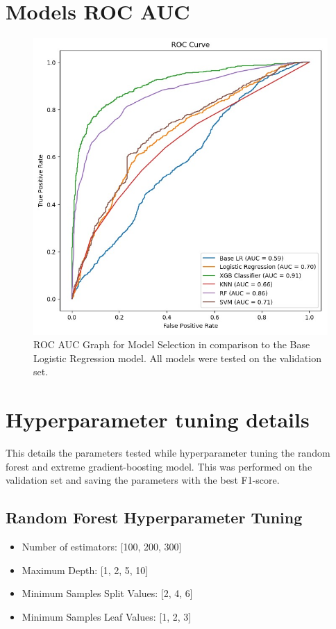 \documentclass{article}
\begin{document}
\begin{appendices}
\section{Models ROC AUC}
\begin{figure}[H]
  \centering
  \includegraphics[width=0.8\linewidth]{rocCurve.jpg}
  \caption{ROC AUC Graph for Model Selection in comparison to the Base Logistic Regression model. All models were tested on the validation set.}
  \label{fig:dist}
\end{figure}


\section{Hyperparameter tuning details}
This details the parameters tested while hyperparameter tuning the random forest and extreme gradient-boosting model. This was performed on the validation set and saving the parameters with the best F1-score.
\subsection{Random Forest Hyperparameter Tuning}
\begin{itemize}
    \item Number of estimators: [100, 200, 300]
    \item Maximum Depth: [1, 2, 5, 10]
    \item Minimum Samples Split Values: [2, 4, 6]
    \item Minimum Samples Leaf Values: [1, 2, 3]
\end{itemize}


\end{appendices}
\end{document}
